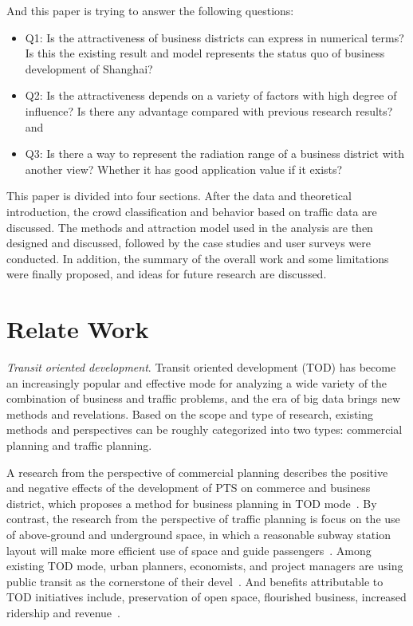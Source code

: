 \documentclass[journal]{IEEEtran}
\begin{document}
And this paper is trying to answer the following questions:
\begin{itemize}
\item Q1: Is the attractiveness of business districts can express in numerical terms? Is this the existing result and model represents the status quo of business development of Shanghai?
\item Q2: Is the attractiveness depends on a variety of factors with high degree of influence? Is there any advantage compared with previous research results? and
\item Q3: Is there a way to represent the radiation range of a business district with another view? Whether it has good application value if it exists?
\end{itemize}

This paper is divided into four sections. After the data and theoretical introduction, the crowd classification and behavior based on traffic data are discussed. The methods and attraction model used in the analysis are then designed and discussed, followed by the case studies and user surveys were conducted. In addition, the summary of the overall work and some limitations were finally proposed, and ideas for future research are discussed.


\section{Relate Work}

\emph{Transit oriented development}. Transit oriented development (TOD) has become an increasingly popular and effective mode for analyzing a wide variety of the combination of business and traffic problems, and the era of big data brings new methods and revelations. Based on the scope and type of research, existing methods and perspectives can be roughly categorized into two types: commercial planning and traffic planning.

A research from the perspective of commercial planning describes  the positive and negative effects of the development of PTS on commerce and business district, which proposes a method for business planning in TOD mode~\cite{Allen2007Integrating,Jie2007Public}. By contrast, the research from the perspective of traffic planning is focus on the use of above-ground and underground space, in which a reasonable subway station layout will make more efficient use of space and guide passengers~\cite{Jie2007Public,Vera2014PERENCANAAN,Lu2005URBAN}. Among existing TOD mode, urban planners, economists, and project managers are using public transit as the cornerstone of their devel~\cite{N2004The}. And benefits attributable to TOD initiatives include, preservation of open space, flourished business, increased ridership and revenue~\cite{Cervero2004Transit}.
\end{document}
